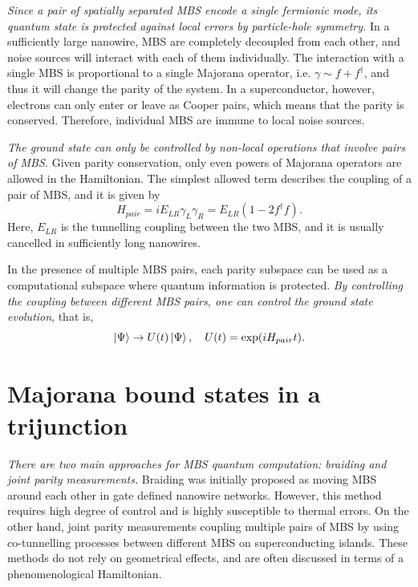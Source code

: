 \textit{Since a pair of spatially separated MBS encode a single fermionic mode, its quantum state is protected against local errors by particle-hole symmetry.}
In a sufficiently large nanowire, MBS are completely decoupled from each other, and noise sources will interact with each of them individually.
The interaction with a single MBS is proportional to a single Majorana operator, i.e. $\gamma \sim f + f^{\dagger}$, and thus it will change the parity of the system.
In a superconductor, however, electrons can only enter or leave as Cooper pairs, which means that the parity is conserved. 
Therefore, individual MBS are immune to local noise sources.

\textit{The ground state can only be controlled by non-local operations that involve pairs of MBS.}
Given parity conservation, only even powers of Majorana operators are allowed in the Hamiltonian.
The simplest allowed term describes the coupling of a pair of MBS, and it is given by
\begin{equation}
H_{pair} = i E_{LR} \gamma_{L} \gamma_{R} = E_{LR} (1 - 2 f^{\dagger} f).
\end{equation}
Here, $E_{LR}$ is the tunnelling coupling between the two MBS, and it is usually cancelled in sufficiently long nanowires.

In the presence of multiple MBS pairs, each parity subspace can be used as a computational subspace where quantum information is protected.
\textit{By controlling the coupling between different MBS pairs, one can control the ground state evolution}, that is,
\begin{equation}
\ket{\Psi} \rightarrow U(t)\ket{\Psi}, \quad U(t) = \exp(iH_{pair} t).
\end{equation}

\section{Majorana bound states in a trijunction}

\textit{There are two main approaches for MBS quantum computation: braiding and joint parity measurements.}
Braiding was initially proposed as moving MBS around each other in gate defined nanowire networks\cite{Alicea2011}. 
However, this method requires high degree of control and is highly susceptible to thermal errors\cite{Pedrocchi2015}.
On the other hand, joint parity measurements coupling multiple pairs of MBS\cite{Plugge2017} by using co-tunnelling processes between different MBS on superconducting islands.
These methods do not rely on geometrical effects, and are often discussed in terms of a phenomenological Hamiltonian.

